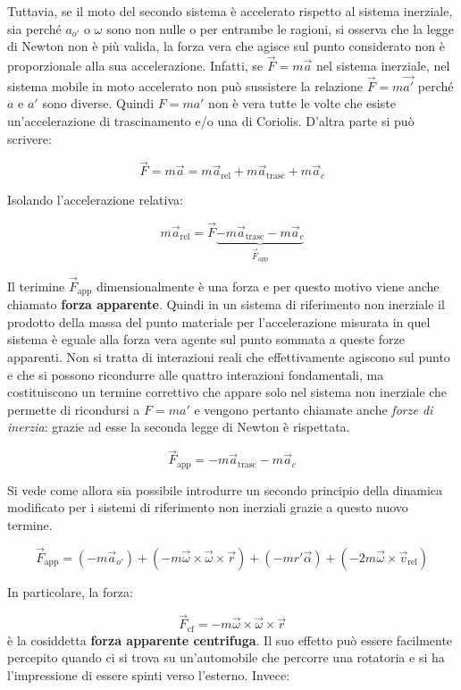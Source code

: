 Tuttavia, se il moto del secondo sistema è accelerato rispetto al sistema inerziale, sia perché $a_{o'}$ o $\omega$ sono non nulle o per entrambe le ragioni, si osserva che la legge di Newton non è più valida, la forza vera che agisce sul punto considerato non è proporzionale alla sua accelerazione. Infatti, se $\vec{F}=m\vec{a}$ nel sistema inerziale, nel sistema mobile in moto accelerato non può sussistere la relazione $\vec{F}=m\vec{a'}$ perché $a$ e $a'$ sono diverse.
Quindi $F=ma'$ non è vera tutte le volte che esiste un'accelerazione di trascinamento e/o una di Coriolis. D'altra parte si può scrivere:

\[
	\vec{F}=m\vec{a}=m\vec{a}_{\text{rel}}+m\vec{a}_{\text{trasc}}+m\vec{a}_c
\]

Isolando l'accelerazione relativa:

\[
	m\vec{a}_{\text{rel}}=\vec{F} \underbrace{-m\vec{a}_{\text{trasc}}-m\vec{a}_c}_{\vec{F}_{\text{app}}}
\]

Il terimine $\vec{F}_{\text{app}}$ dimensionalmente è una forza e per questo motivo viene anche chiamato \textbf{forza apparente}. Quindi in un sistema di riferimento non inerziale il prodotto della massa del punto materiale per l'accelerazione misurata in quel sistema è eguale alla forza vera agente sul punto sommata a queste forze apparenti. Non si tratta di interazioni reali che effettivamente agiscono sul punto e che si possono ricondurre alle quattro interazioni fondamentali, ma costituiscono un termine correttivo che appare solo nel sistema non inerziale che permette di ricondursi a $F=ma'$ e vengono pertanto chiamate anche \textit{forze di inerzia}: grazie ad esse la seconda legge di Newton è rispettata.

\[
	\vec{F}_{\text{app}}=-m\vec{a}_{\text{trasc}}-m\vec{a}_c
\]

Si vede come allora sia possibile introdurre un secondo principio della dinamica modificato per i sistemi di riferimento non inerziali grazie a questo nuovo termine.

\[
	\vec{F}_{\text{app}}=(-m\vec{a}_{o'})+(-m\vec{\omega}\times \vec{\omega} \times \vec{r})+(-mr'\vec{\alpha})+(-2m\vec{\omega} \times \vec{v}_{\text{rel}})
\]

In particolare, la forza:

\[
	\vec{F}_{\text{cf}}=-m\vec{\omega}\times \vec{\omega} \times \vec{r}
\]
è la cosiddetta \textbf{forza apparente centrifuga}. Il suo effetto può essere facilmente percepito quando ci si trova su un'automobile che percorre una rotatoria e si ha l'impressione di essere spinti verso l'esterno. Invece:

